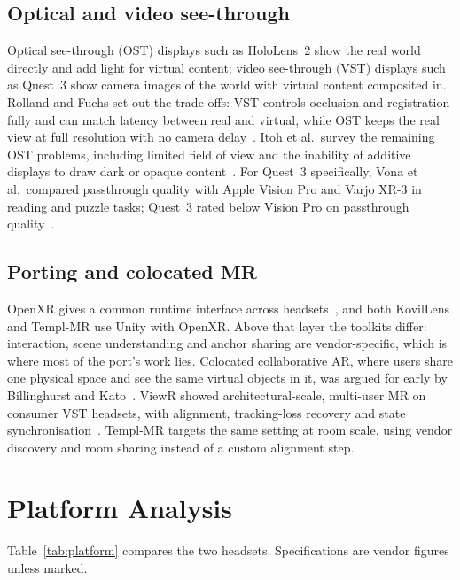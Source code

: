 \documentclass[conference]{IEEEtran}
\begin{document}
\subsection{Optical and video see-through}
Optical see-through (OST) displays such as HoloLens~2 show the real world directly and add light for virtual content; video see-through (VST) displays such as Quest~3 show camera images of the world with virtual content composited in. Rolland and Fuchs set out the trade-offs: VST controls occlusion and registration fully and can match latency between real and virtual, while OST keeps the real view at full resolution with no camera delay~\cite{rolland2000}. Itoh et al.\ survey the remaining OST problems, including limited field of view and the inability of additive displays to draw dark or opaque content~\cite{itoh2021}. For Quest~3 specifically, Vona et al.\ compared passthrough quality with Apple Vision Pro and Varjo XR-3 in reading and puzzle tasks; Quest~3 rated below Vision Pro on passthrough quality~\cite{vona2025}.

\subsection{Porting and colocated MR}
OpenXR gives a common runtime interface across headsets~\cite{openxr2019}, and both KovilLens and Templ-MR use Unity with OpenXR. Above that layer the toolkits differ: interaction, scene understanding and anchor sharing are vendor-specific, which is where most of the port's work lies. Colocated collaborative AR, where users share one physical space and see the same virtual objects in it, was argued for early by Billinghurst and Kato~\cite{billinghurst2002}. ViewR showed architectural-scale, multi-user MR on consumer VST headsets, with alignment, tracking-loss recovery and state synchronisation~\cite{schier2024}. Templ-MR targets the same setting at room scale, using vendor discovery and room sharing instead of a custom alignment step.

\section{Platform Analysis}\label{sec:platform}
Table~\ref{tab:platform} compares the two headsets. Specifications are vendor figures unless marked.
\end{document}
